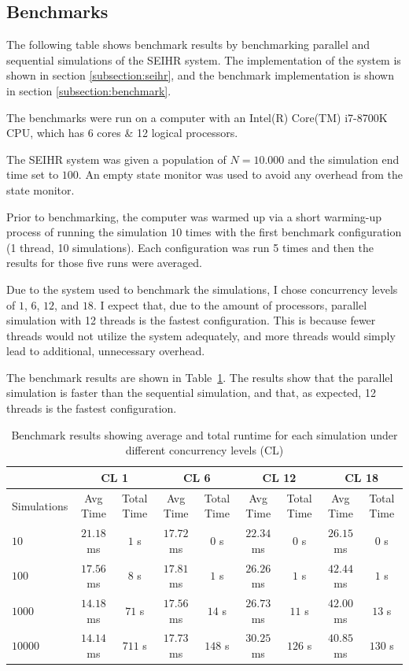 \subsection{Benchmarks}
The following table shows benchmark results by benchmarking parallel and sequential simulations of the SEIHR system.
The implementation of the system is shown in section \ref{subsection:seihr}, and the benchmark implementation is shown in section \ref{subsection:benchmark}.

The benchmarks were run on a computer with an Intel(R) Core(TM) i7-8700K CPU, which has 6 cores \& 12 logical processors.

The SEIHR system was given a population of $N=10.000$ and the simulation end time set to $100$.
An empty state monitor was used to avoid any overhead from the state monitor.

Prior to benchmarking, the computer was warmed up via a short warming-up process of running the simulation $10$ times with the first benchmark configuration (1 thread, 10 simulations).
Each configuration was run 5 times and then the results for those five runs were averaged.

Due to the system used to benchmark the simulations, I chose concurrency levels of $1$, $6$, $12$, and $18$.
I expect that, due to the amount of processors, parallel simulation with 12 threads is the fastest configuration.
This is because fewer threads would not utilize the system adequately, and more threads would simply lead to additional, unnecessary overhead.

The benchmark results are shown in Table~\ref{tab:benchmark_results}.
The results show that the parallel simulation is faster than the sequential simulation, and that, as expected, 12 threads is the fastest configuration.


\begin{table}[htbp]
\centering
\begin{tabular}{|l|c|c|c|c|c|c|c|c|}
\hline
 & \multicolumn{2}{c|}{CL 1} & \multicolumn{2}{c|}{CL 6} & \multicolumn{2}{c|}{CL 12} & \multicolumn{2}{c|}{CL 18} \\
\hline
Simulations & Avg Time & Total Time & Avg Time & Total Time & Avg Time & Total Time & Avg Time & Total Time \\
\hline
$10$ & $21$.$18$ ms & $1$ s & $17$.$72$ ms & $0$ s & $22$.$34$ ms & $0$ s & $26$.$15$ ms & $0$ s \\
\hline
$100$ & $17$.$56$ ms & $8$ s & $17$.$81$ ms & $1$ s & $26$.$26$ ms & $1$ s & $42$.$44$ ms & $1$ s \\
\hline
$1000$ & $14$.$18$ ms & $71$ s & $17$.$56$ ms & $14$ s & $26$.$73$ ms & $11$ s & $42$.$00$ ms & $13$ s \\
\hline
$10000$ & $14$.$14$ ms & $711$ s & $17$.$73$ ms & $148$ s & $30$.$25$ ms & $126$ s & $40$.$85$ ms & $130$ s \\
\hline
\end{tabular}
\caption{Benchmark results showing average and total runtime for each simulation under different concurrency levels (CL)}
\label{tab:benchmark_results}
\end{table}

